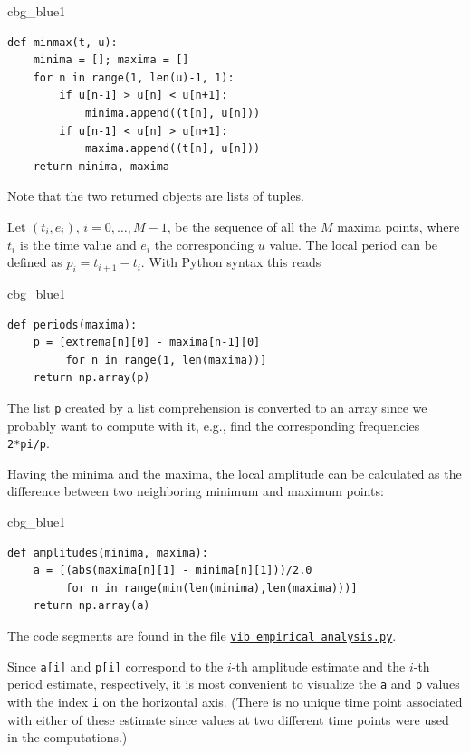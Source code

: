 \documentclass[%
oneside,                 %
final,                   %
10pt]{article}
\newenvironment{_cod_tight}[1]{
   \def\FrameCommand{\colorbox{#1}}
   \FrameRule0.6pt\MakeFramed {\FrameRestore}\vskip3mm}
   {\vskip0mm\endMakeFramed}
\newenvironment{cod}[1]{
\bgroup\rmfamily
\fboxsep=0mm\relax
\begin{_cod_tight}{#1}
\list{}{\parsep=-2mm\parskip=0mm\topsep=0pt\leftmargin=2mm
\rightmargin=2\leftmargin\leftmargin=4pt\relax}
\item\relax}
{\endlist\end{_cod_tight}\egroup}
\begin{document}
\begin{cod}{cbg_blue1}\begin{Verbatim}[numbers=none,fontsize=\fontsize{9pt}{9pt},baselinestretch=0.95,xleftmargin=2mm]
def minmax(t, u):
    minima = []; maxima = []
    for n in range(1, len(u)-1, 1):
        if u[n-1] > u[n] < u[n+1]:
            minima.append((t[n], u[n]))
        if u[n-1] < u[n] > u[n+1]:
            maxima.append((t[n], u[n]))
    return minima, maxima
\end{Verbatim}
\end{cod}
\noindent
Note that the two returned objects are lists of tuples.

Let $(t_i, e_i)$, $i=0,\ldots,M-1$, be the sequence of all
the $M$ maxima points, where $t_i$
is the time value and $e_i$ the corresponding $u$ value.
The local period can be defined as $p_i=t_{i+1}-t_i$.
With Python syntax this reads

\begin{cod}{cbg_blue1}\begin{Verbatim}[numbers=none,fontsize=\fontsize{9pt}{9pt},baselinestretch=0.95,xleftmargin=2mm]
def periods(maxima):
    p = [extrema[n][0] - maxima[n-1][0]
         for n in range(1, len(maxima))]
    return np.array(p)
\end{Verbatim}
\end{cod}
\noindent
The list \texttt{p} created by a list comprehension is converted to an array
since we probably want to compute with it, e.g., find the corresponding
frequencies \texttt{2*pi/p}.

Having the minima and the maxima, the local amplitude can be
calculated as the difference between two neighboring minimum and
maximum points:

\begin{cod}{cbg_blue1}\begin{Verbatim}[numbers=none,fontsize=\fontsize{9pt}{9pt},baselinestretch=0.95,xleftmargin=2mm]
def amplitudes(minima, maxima):
    a = [(abs(maxima[n][1] - minima[n][1]))/2.0
         for n in range(min(len(minima),len(maxima)))]
    return np.array(a)
\end{Verbatim}
\end{cod}
\noindent
The code segments are found in the file \href{{http://tinyurl.com/nm5587k/vib/vib_empirical_analysis.py}}{\nolinkurl{vib_empirical_analysis.py}}.

Since \texttt{a[i]} and \texttt{p[i]} correspond to
the $i$-th amplitude estimate and the $i$-th period estimate, respectively,
it is most convenient to visualize the \texttt{a} and \texttt{p} values with the
index \texttt{i} on the horizontal axis.
(There is no unique time point associated with either of these estimate
since values at two different time points were used in the
computations.)
\end{document}
